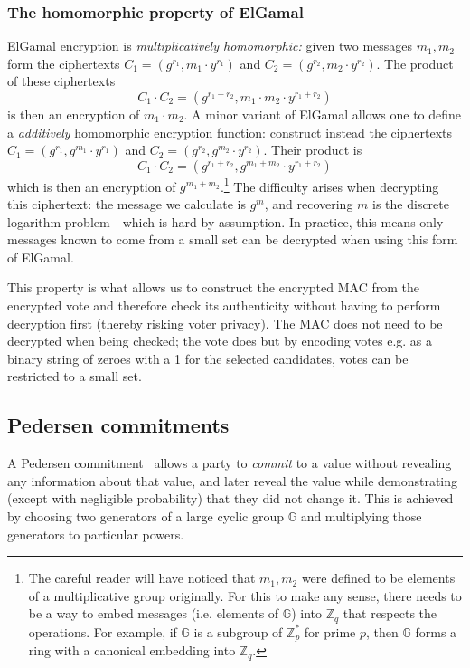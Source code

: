 \documentclass[12pt,a4paper]{article}
\theoremstyle{definition}
\begin{document}
\subsubsection{The homomorphic property of ElGamal}
ElGamal encryption is \textit{multiplicatively homomorphic:} given two messages $m_1, m_2$ form the ciphertexts $C_1 = (g^{r_1}, m_1\cdot y^{r_1})$ and $C_2 = (g^{r_2}, m_2\cdot y^{r_2})$. The product of these ciphertexts
$$C_1\cdot C_2 = (g^{r_1+r_2}, m_1\cdot m_2\cdot y^{r_1+r_2})$$
is then an encryption of $m_1\cdot m_2$. A minor variant of ElGamal allows one to define a \textit{additively} homomorphic encryption function: construct instead the ciphertexts $C_1 = (g^{r_1}, g^{m_1}\cdot y^{r_1})$ and $C_2 = (g^{r_2}, g^{m_2}\cdot y^{r_2})$. Their product is
$$C_1\cdot C_2 = (g^{r_1+r_2}, g^{m_1 + m_2}\cdot y^{r_1+r_2})$$
which is then an encryption of $g^{m_1 + m_2}$.\footnote{The careful reader will have noticed that $m_1, m_2$ were defined to be elements of a multiplicative group originally. For this to make any sense, there needs to be a way to embed messages (i.e. elements of $\mathbb{G}$) into $\mathbb{Z}_q$ that respects the operations. For example, if $\mathbb{G}$ is a subgroup of $\mathbb{Z}^*_p$ for prime $p$, then $\mathbb{G}$ forms a ring with a canonical embedding into $\mathbb{Z}_q$.} The difficulty arises when decrypting this ciphertext: the message we calculate is $g^m$, and recovering $m$ is the discrete logarithm problem---which is hard by assumption. In practice, this means only messages known to come from a small set can be decrypted when using this form of ElGamal.

This property is what allows us to construct the encrypted MAC from the encrypted vote and therefore check its authenticity without having to perform decryption first (thereby risking voter privacy). The MAC does not need to be decrypted when being checked; the vote does but by encoding votes e.g. as a binary string of zeroes with a 1 for the selected candidates, votes can be restricted to a small set.

\subsection{Pedersen commitments}
A Pedersen commitment~\cite{pedersen1991non} allows a party to \textit{commit} to a value without revealing any information about that value, and later reveal the value while demonstrating (except with negligible probability) that they did not change it. This is achieved by choosing two generators of a large cyclic group $\mathbb{G}$ and multiplying those generators to particular powers.
\end{document}
